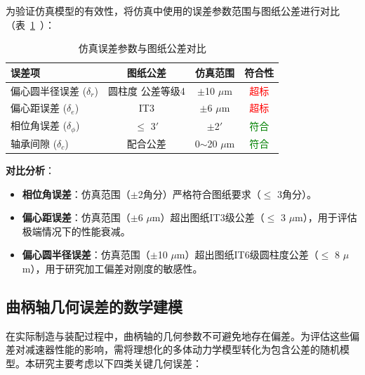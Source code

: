 \documentclass[12pt]{ctexart}
\begin{document}
为验证仿真模型的有效性，将仿真中使用的误差参数范围与图纸公差进行对比（表~\ref{tab:simulation-vs-drawing}~）：

\begin{table}[htbp]
\centering
\small
\caption{仿真误差参数与图纸公差对比}
\label{tab:simulation-vs-drawing}
\begin{tabular}{lccc}
\toprule
误差项 & 图纸公差 & 仿真范围 & 符合性 \\
\midrule
偏心圆半径误差 ($\delta_r$) & 圆柱度 公差等级4 & $\pm$10 $\mu$m & \textcolor{red}{超标} \\
偏心距误差 ($\delta_e$) & IT3 & $\pm$6 $\mu$m & \textcolor{red}{超标} \\
相位角误差 ($\delta_\phi$) & $\le$ 3$'$ & $\pm$2$'$ & \textcolor{green}{符合} \\
轴承间隙 ($\delta_c$) & 配合公差 & 0$\sim$20 $\mu$m & \textcolor{green}{符合} \\
\bottomrule
\end{tabular}
\end{table}

\textbf{对比分析}：
\begin{itemize}
    \item \textbf{相位角误差}：仿真范围（$\pm$2角分）严格符合图纸要求（$\le$ 3角分）。
    \item \textbf{偏心距误差}：仿真范围（$\pm$6 $\mu$m）超出图纸IT3级公差（$\le$ 3 $\mu$m），用于评估极端情况下的性能衰减。
    \item \textbf{偏心圆半径误差}：仿真范围（$\pm$10 $\mu$m）超出图纸IT6级圆柱度公差（$\le$ 8 $\mu$m），用于研究加工偏差对刚度的敏感性。
\end{itemize}

\subsection{曲柄轴几何误差的数学建模}
在实际制造与装配过程中，曲柄轴的几何参数不可避免地存在偏差。为评估这些偏差对减速器性能的影响，需将理想化的多体动力学模型转化为包含公差的随机模型。本研究主要考虑以下四类关键几何误差：
\end{document}
